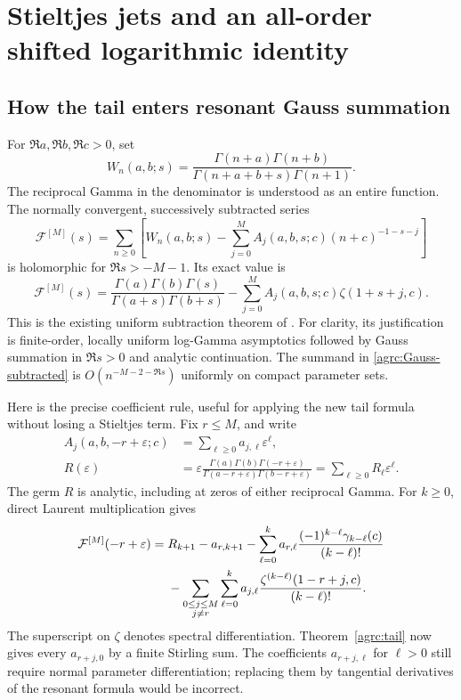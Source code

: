 \documentclass[11pt]{article}
\numberwithin{equation}{section}
\theoremstyle{definition}\newtheorem{definition}[theorem]{Definition}
\theoremstyle{remark}\newtheorem{remark}[theorem]{Remark}
\begin{document}
\section{Stieltjes jets and an all-order shifted logarithmic identity}
\label{agrc:Stieltjes-sums}

\subsection{How the tail enters resonant Gauss summation}

For $\Re a,\Re b,\Re c>0$, set
\[
 W_n(a,b;s)=\frac{\Gamma(n+a)\Gamma(n+b)}
                 {\Gamma(n+a+b+s)\Gamma(n+1)}.
\]
The reciprocal Gamma in the denominator is understood as an entire
function. The normally convergent, successively subtracted series
\begin{equation}\label{agrc:Gauss-subtracted}
 \mathcal F^{[M]}(s)=\sum_{n\geq0}
 \left[W_n(a,b;s)-\sum_{j=0}^M A_j(a,b,s;c)(n+c)^{-1-s-j}\right]
\end{equation}
is holomorphic for $\Re s>-M-1$. Its exact value is
\begin{equation}\label{agrc:Gauss-closed}
 \mathcal F^{[M]}(s)=
 \frac{\Gamma(a)\Gamma(b)\Gamma(s)}{\Gamma(a+s)\Gamma(b+s)}
       -\sum_{j=0}^M A_j(a,b,s;c)\zeta(1+s+j,c).
\end{equation}
This is the existing uniform subtraction theorem of \cite{repo-gauss}.
For clarity, its justification is finite-order, locally uniform
log-Gamma asymptotics followed by Gauss summation in $\Re s>0$ and
analytic continuation. The summand in \eqref{agrc:Gauss-subtracted}
is $O(n^{-M-2-\Re s})$ uniformly on compact parameter sets.

Here is the precise coefficient rule, useful for applying the new tail
formula without losing a Stieltjes term. Fix $r\leq M$, and write
\begin{align*}
 A_j(a,b,-r+\varepsilon;c)&=\sum_{\ell\geq0}a_{j,\ell}\varepsilon^\ell,\\
 R(\varepsilon)&=\varepsilon
 \frac{\Gamma(a)\Gamma(b)\Gamma(-r+\varepsilon)}
      {\Gamma(a-r+\varepsilon)\Gamma(b-r+\varepsilon)}
       =\sum_{\ell\geq0}R_\ell\varepsilon^\ell.
\end{align*}
The germ $R$ is analytic, including at zeros of either reciprocal Gamma.
For $k\geq0$, direct Laurent multiplication gives
\begin{align}
 [\varepsilon^k]\mathcal F^{[M]}(-r+\varepsilon)
 ={}&R_{k+1}-a_{r,k+1}
 -\sum_{\ell=0}^k a_{r,\ell}
           \frac{(-1)^{k-\ell}\gamma_{k-\ell}(c)}{(k-\ell)!}\notag\\
 &-\sum_{\substack{0\leq j\leq M\\j\ne r}}\sum_{\ell=0}^k
   a_{j,\ell}\frac{\zeta^{(k-\ell)}(1-r+j,c)}{(k-\ell)!}.
 \label{agrc:Gauss-jets}
\end{align}
The superscript on $\zeta$ denotes spectral differentiation.
Theorem~\ref{agrc:tail} now gives every $a_{r+j,0}$ by a finite Stirling
sum. The coefficients $a_{r+j,\ell}$ for $\ell>0$ still require normal
parameter differentiation; replacing them by tangential derivatives of
the resonant formula would be incorrect.
\end{document}
